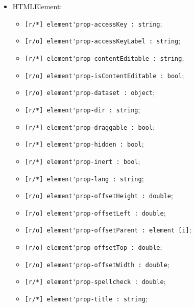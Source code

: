 \documentclass[a4paper, 14pt]{extarticle}
\newenvironment{icItems}
	{ \begin{itemize} [noitemsep,nolistsep] }
	{ \end{itemize} }
\begin{document}
\begin{icItems}
	\item HTMLElement:
	\begin{icItems}
		\item \lstinline|[r/*] element'prop-accessKey : string|;
		\item \lstinline|[r/o] element'prop-accessKeyLabel : string|;
		\item \lstinline|[r/*] element'prop-contentEditable : string|;
		\item \lstinline|[r/o] element'prop-isContentEditable : bool|;
		\item \lstinline|[r/o] element'prop-dataset : object|;
		\item \lstinline|[r/*] element'prop-dir : string|;
		\item \lstinline|[r/*] element'prop-draggable : bool|;
		\item \lstinline|[r/*] element'prop-hidden : bool|;
		\item \lstinline|[r/*] element'prop-inert : bool|;
		\item \lstinline|[r/*] element'prop-lang : string|;
		\item \lstinline|[r/o] element'prop-offsetHeight : double|;
		\item \lstinline|[r/o] element'prop-offsetLeft : double|;
		\item \lstinline|[r/o] element'prop-offsetParent : element [i]|;
		\item \lstinline|[r/o] element'prop-offsetTop : double|;
		\item \lstinline|[r/o] element'prop-offsetWidth : double|;
		\item \lstinline|[r/*] element'prop-spellcheck : double|;
		\item \lstinline|[r/*] element'prop-title : string|;
	\end{icItems}
	

\end{icItems}
\end{document}
